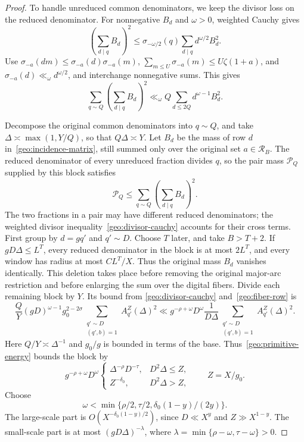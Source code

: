 \documentclass[11pt,a4paper]{article}
\theoremstyle{paperplain}
\numberwithin{equation}{section}
\begin{document}
\begin{proof}
To handle unreduced common denominators, we keep the divisor loss on the
reduced denominator. For nonnegative $B_d$ and $\omega>0$, weighted Cauchy gives
\[
 \left(\sum_{d\mid q}B_d\right)^2
 \le\sigma_{-\omega/2}(q)\sum_{d\mid q}d^{\omega/2}B_d^2.
\]
Use $\sigma_{-a}(dm)\le\sigma_{-a}(d)\sigma_{-a}(m)$,
$\sum_{m\le U}\sigma_{-a}(m)\le U\zeta(1+a)$, and
$\sigma_{-a}(d)\ll_\omega d^{\omega/2}$, and interchange nonnegative sums.
This gives
\begin{equation}\label{geo:divisor-cauchy}
 \sum_{q\sim Q}\left(\sum_{d\mid q}B_d\right)^2
 \ll_\omega Q\sum_{d\le2Q}d^{\omega-1}B_d^2.
\end{equation}

Decompose the original common denominators into $q\sim Q$, and take
$\Delta\asymp\max(1,Y/Q)$, so that $Q\Delta\asymp Y$.
Let $B_d$ be the mass of row $d$ in~\eqref{geo:incidence-matrix}, still summed
only over the original set $a\in\mathcal R_B$.
The reduced denominator of every unreduced fraction divides $q$, so the
pair mass $\mathcal P_Q$ supplied by this block satisfies
\[
 \mathcal P_Q
 \le\sum_{q\sim Q}\left(\sum_{d\mid q}B_d\right)^2.
\]
The two fractions in a pair may have different reduced denominators;
the weighted divisor inequality~\eqref{geo:divisor-cauchy} accounts for
their cross terms.
First group by $d=gq'$ and $q'\sim D$.
Choose $T$ later, and take $B>T+2$.
If $gD\Delta\le L^T$, every reduced denominator in the block is at most
$2L^T$, and every window has radius at most $CL^T/X$.
Thus the original mass $B_d$ vanishes identically.
This deletion takes place before removing the original major-arc restriction
and before enlarging the sum over the digital fibers.
Divide each remaining block by $Y$. Its bound from
\eqref{geo:divisor-cauchy} and~\eqref{geo:fiber-row} is
\[
 \frac QY(gD)^{\omega-1}g_0^{2-2\sigma}
       \sum_{\substack{q'\sim D\\(q',b)=1}}A_{q'}^Z(\Delta)^2
 \ll g^{-\rho+\omega}D^\omega
       \frac1{D\Delta}
       \sum_{\substack{q'\sim D\\(q',b)=1}}A_{q'}^Z(\Delta)^2.
\]
Here $Q/Y\asymp\Delta^{-1}$ and $g_0/g$ is bounded in terms of the base.
Thus~\eqref{geo:primitive-energy} bounds the block by
\begin{equation}\label{geo:block-final}
 g^{-\rho+\omega}D^\omega
 \begin{cases}
 \Delta^{-\rho}D^{-\tau},&D^2\Delta\le Z,\\
 Z^{-\delta_0},&D^2\Delta>Z,
 \end{cases}
 \qquad Z=X/g_0.
\end{equation}
Choose
\[
 \omega<\min\{\rho/2,\tau/2,\delta_0(1-y)/(2y)\}.
\]
The large-scale part is
$O(X^{-\delta_0(1-y)/2})$, since $D\ll X^y$ and $Z\gg X^{1-y}$.
The small-scale part is at most
$(gD\Delta)^{-\lambda}$, where
$\lambda=\min\{\rho-\omega,\tau-\omega\}>0$.


\end{proof}
\end{document}
